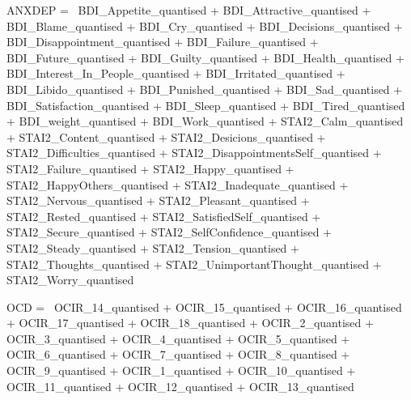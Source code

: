 \documentclass[]{article}
\newenvironment{Shaded}{\begin{snugshade}}{\end{snugshade}}
\newcommand{\StringTok}[1]{\textcolor[rgb]{0.31,0.60,0.02}{#1}}
\begin{document}
\begin{Shaded}
\begin{Highlighting}[]
\StringTok{ANXDEP =~ BDI_Appetite_quantised    + }
\StringTok{       BDI_Attractive_quantised + }
\StringTok{       BDI_Blame_quantised  + }
\StringTok{       BDI_Cry_quantised    +   }
\StringTok{       BDI_Decisions_quantised  +   }
\StringTok{       BDI_Disappointment_quantised +   }
\StringTok{       BDI_Failure_quantised    +   }
\StringTok{       BDI_Future_quantised +   }
\StringTok{       BDI_Guilty_quantised +   }
\StringTok{       BDI_Health_quantised +   }
\StringTok{       BDI_Interest_In_People_quantised +   }
\StringTok{       BDI_Irritated_quantised  +   }
\StringTok{       BDI_Libido_quantised +   }
\StringTok{       BDI_Punished_quantised   +   }
\StringTok{       BDI_Sad_quantised + }
\StringTok{       BDI_Satisfaction_quantised   +   }
\StringTok{       BDI_Sleep_quantised  +   }
\StringTok{       BDI_Tired_quantised  +   }
\StringTok{       BDI_weight_quantised +   }
\StringTok{       BDI_Work_quantised   +}
\StringTok{        STAI2_Calm_quantised +}
\StringTok{        STAI2_Content_quantised +}
\StringTok{        STAI2_Desicions_quantised +}
\StringTok{        STAI2_Difficulties_quantised +}
\StringTok{        STAI2_DisappointmentsSelf_quantised +}
\StringTok{        STAI2_Failure_quantised +}
\StringTok{        STAI2_Happy_quantised +}
\StringTok{        STAI2_HappyOthers_quantised +}
\StringTok{        STAI2_Inadequate_quantised +}
\StringTok{        STAI2_Nervous_quantised +}
\StringTok{        STAI2_Pleasant_quantised +}
\StringTok{        STAI2_Rested_quantised +}
\StringTok{        STAI2_SatisfiedSelf_quantised +}
\StringTok{        STAI2_Secure_quantised +}
\StringTok{        STAI2_SelfConfidence_quantised +}
\StringTok{        STAI2_Steady_quantised +}
\StringTok{        STAI2_Tension_quantised +}
\StringTok{        STAI2_Thoughts_quantised +}
\StringTok{        STAI2_UnimportantThought_quantised +}
\StringTok{        STAI2_Worry_quantised}

\StringTok{OCD =~ OCIR_14_quantised    +   }
\StringTok{       OCIR_15_quantised    +   }
\StringTok{       OCIR_16_quantised    +   }
\StringTok{       OCIR_17_quantised    +   }
\StringTok{       OCIR_18_quantised    +   }
\StringTok{       OCIR_2_quantised +   }
\StringTok{       OCIR_3_quantised +   }
\StringTok{       OCIR_4_quantised +   }
\StringTok{       OCIR_5_quantised +   }
\StringTok{       OCIR_6_quantised +   }
\StringTok{       OCIR_7_quantised +   }
\StringTok{       OCIR_8_quantised +   }
\StringTok{       OCIR_9_quantised +   }
\StringTok{       OCIR_1_quantised +   }
\StringTok{       OCIR_10_quantised    +   }
\StringTok{       OCIR_11_quantised    +   }
\StringTok{       OCIR_12_quantised    +   }
\StringTok{       OCIR_13_quantised}


\end{Highlighting}
\end{Shaded}
\end{document}

